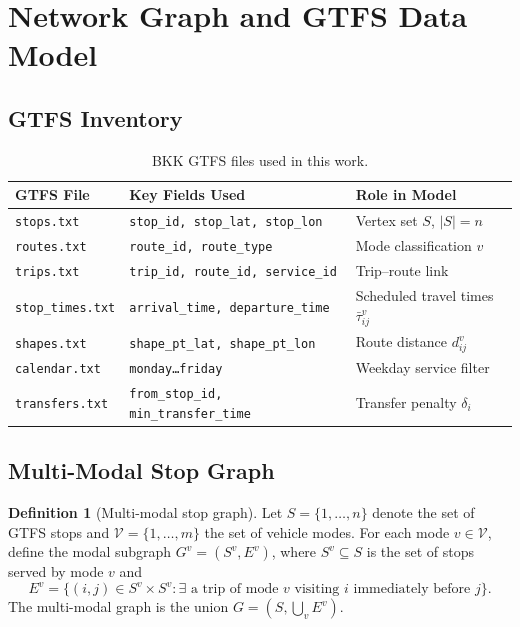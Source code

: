\documentclass[12pt,a4paper]{article}
\theoremstyle{plain}
\theoremstyle{definition}
\newtheorem{definition}[theorem]{Definition}
\theoremstyle{remark}
\begin{document}
\section{Network Graph and GTFS Data Model}
\label{sec:network}

\subsection{GTFS Inventory}

\begin{table}[htbp]
\centering
\small
\begin{tabular}{lll}
\toprule
GTFS File & Key Fields Used & Role in Model \\
\midrule
\texttt{stops.txt}       & \texttt{stop\_id, stop\_lat, stop\_lon}     & Vertex set $S$, $|S|=n$ \\
\texttt{routes.txt}      & \texttt{route\_id, route\_type}             & Mode classification $v$ \\
\texttt{trips.txt}       & \texttt{trip\_id, route\_id, service\_id}   & Trip--route link \\
\texttt{stop\_times.txt} & \texttt{arrival\_time, departure\_time}     & Scheduled travel times $\bar\tau^v_{ij}$ \\
\texttt{shapes.txt}      & \texttt{shape\_pt\_lat, shape\_pt\_lon}     & Route distance $d^v_{ij}$ \\
\texttt{calendar.txt}    & \texttt{monday\ldots friday}                & Weekday service filter \\
\texttt{transfers.txt}   & \texttt{from\_stop\_id, min\_transfer\_time}& Transfer penalty $\delta_i$ \\
\bottomrule
\end{tabular}
\caption{BKK GTFS files used in this work.}
\label{tab:gtfs}
\end{table}

\subsection{Multi-Modal Stop Graph}

\begin{definition}[Multi-modal stop graph]
Let $S=\{1,\ldots,n\}$ denote the set of GTFS stops and
$\mathcal{V}=\{1,\ldots,m\}$ the set of vehicle modes.  For each mode
$v\in\mathcal{V}$, define the modal subgraph $G^v=(S^v,E^v)$, where
$S^v\subseteq S$ is the set of stops served by mode $v$ and
\[
  E^v=\bigl\{(i,j)\in S^v\times S^v:\exists\text{ a trip of mode }v
    \text{ visiting }i\text{ immediately before }j\bigr\}.
\]
The multi-modal graph is the union $G=(S,\bigcup_v E^v)$.
\end{definition}
\end{document}
